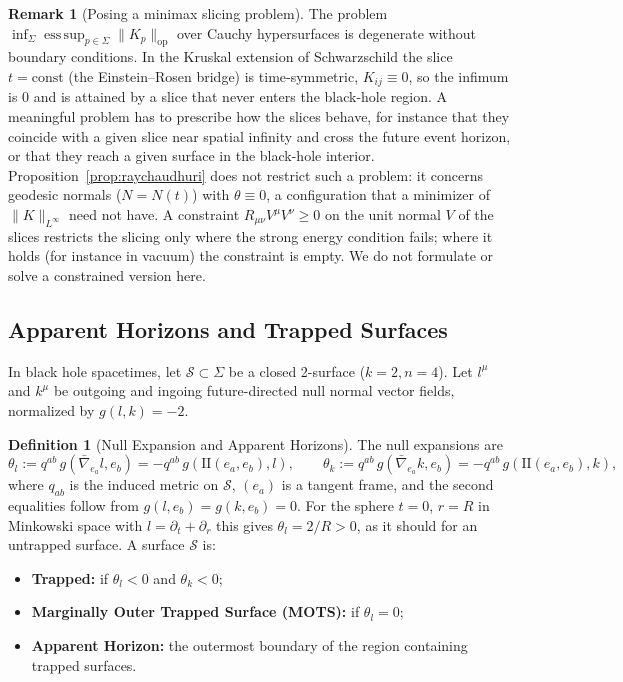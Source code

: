 \documentclass[11pt,reqno]{amsart}
\theoremstyle{definition}
\newtheorem{definition}[theorem]{Definition}
\newtheorem{remark}[theorem]{Remark}
\providecommand{\II}{\mathrm{I\!I}}
\newcommand{\op}{\mathrm{op}}
\numberwithin{equation}{section}
\providecommand{\II}{\mathrm{II}}
\begin{document}
\begin{remark}[Posing a minimax slicing problem]
\label{rem:minimax_slicing}
The problem $\inf_\Sigma \operatorname*{ess\,sup}_{p \in \Sigma} \|K_p\|_{\op}$ over Cauchy hypersurfaces is degenerate without boundary conditions. In the Kruskal extension of Schwarzschild the slice $t = \text{const}$ (the Einstein--Rosen bridge) is time-symmetric, $K_{ij} \equiv 0$, so the infimum is $0$ and is attained by a slice that never enters the black-hole region. A meaningful problem has to prescribe how the slices behave, for instance that they coincide with a given slice near spatial infinity and cross the future event horizon, or that they reach a given surface in the black-hole interior. Proposition~\ref{prop:raychaudhuri} does not restrict such a problem: it concerns geodesic normals ($N = N(t)$) with $\theta \equiv 0$, a configuration that a minimizer of $\|K\|_{L^\infty}$ need not have. A constraint $R_{\mu\nu}V^\mu V^\nu \ge 0$ on the unit normal $V$ of the slices restricts the slicing only where the strong energy condition fails; where it holds (for instance in vacuum) the constraint is empty. We do not formulate or solve a constrained version here.
\end{remark}

\subsection{Apparent Horizons and Trapped Surfaces}
In black hole spacetimes, let $\mathcal{S} \subset \Sigma$ be a closed 2-surface ($k=2, n=4$). Let $l^\mu$ and $k^\mu$ be outgoing and ingoing future-directed null normal vector fields, normalized by $g(l, k) = -2$.

\begin{definition}[Null Expansion and Apparent Horizons]
The null expansions are
\begin{equation}
\theta_l := q^{ab}\, g(\bar{\nabla}_{e_a} l, e_b) = -q^{ab}\, g(\II(e_a, e_b), l), \qquad \theta_k := q^{ab}\, g(\bar{\nabla}_{e_a} k, e_b) = -q^{ab}\, g(\II(e_a, e_b), k),
\end{equation}
where $q_{ab}$ is the induced metric on $\mathcal{S}$, $(e_a)$ is a tangent frame, and the second equalities follow from $g(l, e_b) = g(k, e_b) = 0$. For the sphere $t = 0$, $r = R$ in Minkowski space with $l = \partial_t + \partial_r$ this gives $\theta_l = 2/R > 0$, as it should for an untrapped surface. A surface $\mathcal{S}$ is:
\begin{itemize}
    \item \textbf{Trapped:} if $\theta_l < 0$ and $\theta_k < 0$;
    \item \textbf{Marginally Outer Trapped Surface (MOTS):} if $\theta_l = 0$;
    \item \textbf{Apparent Horizon:} the outermost boundary of the region containing trapped surfaces.
\end{itemize}
\end{definition}
\end{document}
